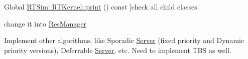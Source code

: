 \begin{DoxyRefList}
Global \hyperlink{classRTSim_1_1RTKernel_a2f7c6287046804748fc6c385f53b5227}{R\+T\+Sim\+:\+:R\+T\+Kernel\+:\+:print} () const ]check all child classes.  
\item[\label{todo__todo000011}%
\hypertarget{todo__todo000011}{}%
Global \hyperlink{classRTSim_1_1Scheduler_aa1f247653b81e44ca2fc343b8aa88e13}{R\+T\+Sim\+:\+:Scheduler\+:\+:P\+I\+R\+Manager} ]change it into \hyperlink{classRTSim_1_1ResManager}{Res\+Manager}  
\item[\label{todo__todo000012}%
\hypertarget{todo__todo000012}{}%
Class \hyperlink{classRTSim_1_1Server}{R\+T\+Sim\+:\+:Server} ]Implement other algorithms, like Sporadic \hyperlink{classRTSim_1_1Server}{Server} (fixed priority and Dynamic priority versions), Deferrable \hyperlink{classRTSim_1_1Server}{Server}, etc. Need to implement T\+BS as well.


\end{DoxyRefList}
